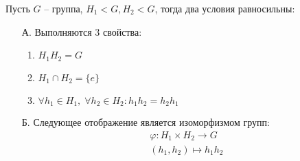 \begin{theorem-non} Пусть $G$ -- группа, $H_1 < G, H_2 < G$, тогда два условия равносильны: 
    \begin{itemize}
        \item[А.] Выполняются 3 свойства: 
        \begin{enumerate}
            \item $H_1 H_2 = G$
            \item $H_1 \cap H_2 = \{e\}$
            \item $\forall h_1 \in H_1, \; \forall h_2 \in H_2 : h_1 h_2 = h_2 h_1$
        \end{enumerate} 
        \item[Б.] Следующее отображение является изоморфизмом групп:  
        \begin{gather*}
            \varphi : H_1 \times H_2 \longrightarrow G \\
            (h_1, h_2) \longmapsto h_1 h_2
        \end{gather*}
    \end{itemize}
\end{theorem-non}
